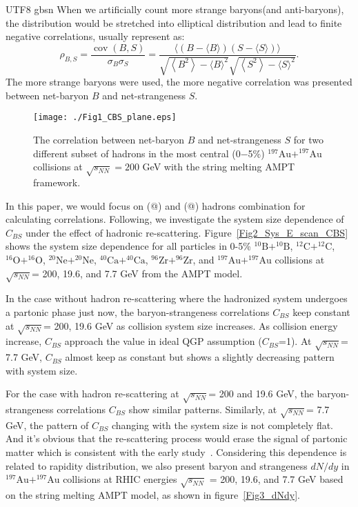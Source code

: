 \documentclass[twocolumn,showpacs,preprintnumbers,superscriptaddress,amsmath,amssymb]{revtex4}
\makeatletter
\newcommand{\Rmnum}[1]{\expandafter\@slowromancap\romannumeral #1@}
\makeatother
\begin{document}
\begin{CJK*} {UTF8} {gbsn}
	When we artificially count more strange baryons(and anti-baryons), the distribution would be stretched into elliptical distribution and lead to finite negative correlations, usually 
	represent as:
	\begin{equation}
\rho_{B, S}=\frac{\operatorname{cov}(B, S)}{\sigma_{B} \sigma_{S}}=\frac{\langle(B-\langle B\rangle)(S-\langle S\rangle)\rangle}{\sqrt{\left\langle B^{2}\right\rangle-\langle B\rangle^{2}} \sqrt{\left\langle S^{2}\right\rangle-\langle S\rangle^{2}}}.
\end{equation}
The more strange baryons were used, the more negative correlation was presented between net-baryon $B$ and net-strangeness $S$.
	
		\begin{figure}[htb]
				\texttt{[image: ./Fig1\_CBS\_plane.eps]}
				\caption{The correlation between net-baryon $B$ and net-strangeness $S$ for two different subset of hadrons in the most central (0$-$5\%) $\mathrm{^{197}Au+^{197}Au}$ collisions at $\sqrt{s_{NN}} = 200$ GeV with the string melting AMPT framework.}
				\label{Fig1_BS_plane}
	\end{figure}

	In this paper, we would focus on (\Rmnum{1}) and (\Rmnum{2}) hadrons combination for calculating correlations. Following, we investigate the system size dependence of $C_{BS}$ under the effect of hadronic re-scattering. Figure~\ref{Fig2_Sys_E_scan_CBS} shows the system size dependence for all particles in 0-5\% $\mathrm{^{10}B+^{10}B}$, $\mathrm{^{12}C+^{12}C}$, $\mathrm{^{16}O+^{16}O}$, $\mathrm{^{20}Ne+^{20}Ne}$, $\mathrm{^{40}Ca+^{40}Ca}$, $\mathrm{^{96}Zr+^{96}Zr}$, and $\mathrm{^{197}Au+^{197}Au}$ collisions at $\sqrt{s_{NN}}$= 200, 19.6, and 7.7 GeV from the AMPT model. 
	
	In the case without hadron re-scattering where the hadronized system undergoes a partonic phase just now, the baryon-strangeness correlations $C_{BS}$ keep constant at $\sqrt{s_{NN}}$= 200, 19.6 GeV as collision system size increases. As collision energy increase, $C_{BS}$ approach the value in ideal QGP assumption ($C_{BS}$=1). At $\sqrt{s_{NN}}$= 7.7 GeV, $C_{BS}$ almost keep as constant but shows a slightly decreasing pattern with system size.
	
	For the case with hadron re-scattering at $\sqrt{s_{NN}}$= 200 and 19.6 GeV, the baryon-strangeness correlations $C_{BS}$ show similar patterns. Similarly, at $\sqrt{s_{NN}}$= 7.7 GeV, the pattern of $C_{BS}$ changing with the system size is not completely flat. And it's obvious that the re-scattering process would erase the signal of partonic matter which is consistent with the early study~\cite{Jin_2008}.
Considering this dependence is related to rapidity distribution, we also present baryon and strangeness $dN/dy$ in $\mathrm{^{197}Au+^{197}Au}$ collisions at RHIC energies $\sqrt{s_{NN}}$ = 200, 19.6, and 7.7 GeV based on the string melting AMPT model, as shown in figure~\ref{Fig3_dNdy}.
	 

\end{CJK*}
\end{document}
